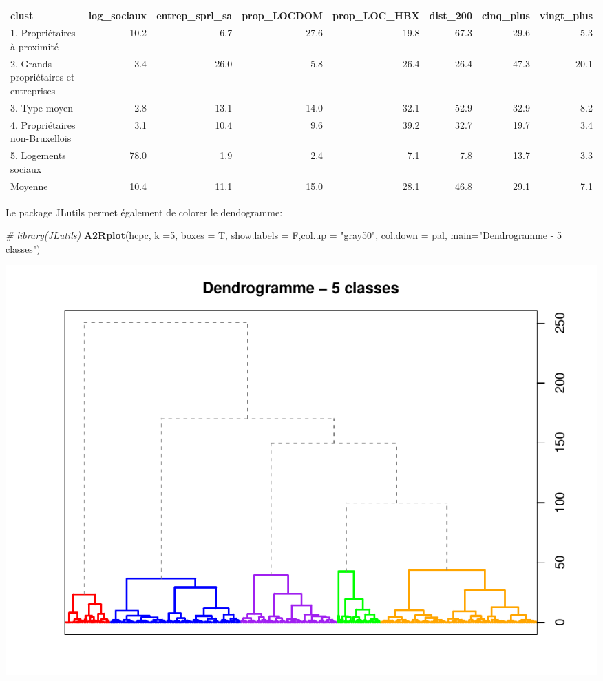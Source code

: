 \documentclass[
]{book}
\newenvironment{Shaded}{\begin{snugshade}}{\end{snugshade}}
\newcommand{\AttributeTok}[1]{\textcolor[rgb]{0.13,0.29,0.53}{#1}}
\newcommand{\CommentTok}[1]{\textcolor[rgb]{0.56,0.35,0.01}{\textit{#1}}}
\newcommand{\DecValTok}[1]{\textcolor[rgb]{0.00,0.00,0.81}{#1}}
\newcommand{\FunctionTok}[1]{\textcolor[rgb]{0.13,0.29,0.53}{\textbf{#1}}}
\newcommand{\NormalTok}[1]{#1}
\newcommand{\StringTok}[1]{\textcolor[rgb]{0.31,0.60,0.02}{#1}}
\begin{document}
\begin{tabular}{l|r|r|r|r|r|r|r}
\hline
clust & log\_sociaux & entrep\_sprl\_sa & prop\_LOCDOM & prop\_LOC\_HBX & dist\_200 & cinq\_plus & vingt\_plus\\
\hline
1. Propriétaires à proximité & 10.2 & 6.7 & 27.6 & 19.8 & 67.3 & 29.6 & 5.3\\
\hline
2. Grands propriétaires et entreprises & 3.4 & 26.0 & 5.8 & 26.4 & 26.4 & 47.3 & 20.1\\
\hline
3. Type moyen & 2.8 & 13.1 & 14.0 & 32.1 & 52.9 & 32.9 & 8.2\\
\hline
4. Propriétaires non-Bruxellois & 3.1 & 10.4 & 9.6 & 39.2 & 32.7 & 19.7 & 3.4\\
\hline
5. Logements sociaux & 78.0 & 1.9 & 2.4 & 7.1 & 7.8 & 13.7 & 3.3\\
\hline
Moyenne & 10.4 & 11.1 & 15.0 & 28.1 & 46.8 & 29.1 & 7.1\\
\hline
\end{tabular}

Le package JLutils permet également de colorer le dendogramme:

\begin{Shaded}
\begin{Highlighting}[]
\CommentTok{\# library(JLutils)}
\FunctionTok{A2Rplot}\NormalTok{(hcpc, }\AttributeTok{k =}\DecValTok{5}\NormalTok{, }\AttributeTok{boxes =}\NormalTok{ T, }\AttributeTok{show.labels =}\NormalTok{ F,}\AttributeTok{col.up =} \StringTok{"gray50"}\NormalTok{,}
        \AttributeTok{col.down =}\NormalTok{ pal, }\AttributeTok{main=}\StringTok{"Dendrogramme {-} 5 classes"}\NormalTok{)}
\end{Highlighting}
\end{Shaded}

\includegraphics{manuel_geo_quanti_files/figure-latex/unnamed-chunk-108-1.pdf}
\end{document}
